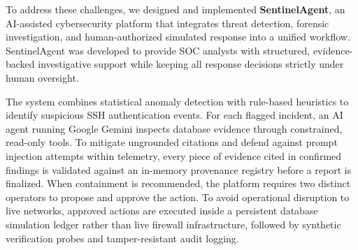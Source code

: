 \documentclass[conference]{IEEEtran}
\begin{document}
To address these challenges, we designed and implemented \textbf{SentinelAgent}, an AI-assisted cybersecurity platform that integrates threat detection, forensic investigation, and human-authorized simulated response into a unified workflow. SentinelAgent was developed to provide SOC analysts with structured, evidence-backed investigative support while keeping all response decisions strictly under human oversight.

The system combines statistical anomaly detection with rule-based heuristics to identify suspicious SSH authentication events. For each flagged incident, an AI agent running Google Gemini inspects database evidence through constrained, read-only tools. To mitigate ungrounded citations and defend against prompt injection attempts within telemetry, every piece of evidence cited in confirmed findings is validated against an in-memory provenance registry before a report is finalized. When containment is recommended, the platform requires two distinct operators to propose and approve the action. To avoid operational disruption to live networks, approved actions are executed inside a persistent database simulation ledger rather than live firewall infrastructure, followed by synthetic verification probes and tamper-resistant audit logging.
\end{document}
